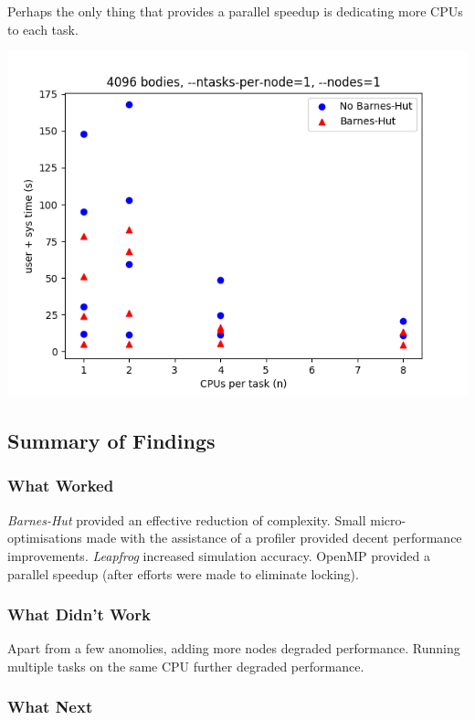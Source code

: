 \documentclass[11pt,a4paper]{article}
\begin{document}
Perhaps the only thing that provides a parallel speedup is dedicating more CPUs to each task.

\includegraphics[width=14.2cm]{scaling}

\subsection*{Summary of Findings}

\subsubsection*{What Worked}

\textit{Barnes-Hut} provided an effective reduction of complexity. Small micro-optimisations made with the assistance of a profiler provided decent performance improvements. \textit{Leapfrog} increased simulation accuracy. OpenMP provided a parallel speedup (after efforts were made to eliminate locking).

\subsubsection*{What Didn't Work}

 Apart from a few anomolies, adding more nodes degraded performance. Running multiple tasks on the same CPU further degraded performance. 

 \subsubsection*{What Next}
\end{document}
